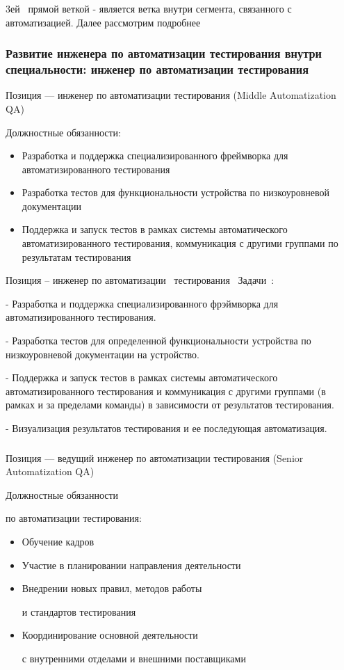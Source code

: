 \documentclass{../industrial-development}
\begin{document}
\lecturenotes

 3ей~\cite{mc} прямой веткой  - является ветка внутри сегмента, связанного с автоматизацией. Далее рассмотрим подробнее

\begin{frame} \frametitle{Развитие инженера по автоматизации тестирования внутри специальности: инженер по автоматизации тестирования }
 \begin{block}{}
  \alert{Позиция ---  инженер по автоматизации тестирования (Middle Automatization QA)}

Должностные обязанности: 
  \end{block}
  \begin{itemize}
  \item Разработка и поддержка специализированного фреймворка для автоматизированного тестирования
  \item  Разработка тестов для функциональности устройства по низкоуровневой документации 
  \item Поддержка и запуск тестов в рамках системы автоматического автоматизированного тестирования, коммуникация с другими группами по результатам тестирования
  \end{itemize}
\end{frame}

\lecturenotes

Позиция – инженер по автоматизации~\cite{hh} тестирования~\cite{itcf}
Задачи~\cite{rab}:

- Разработка и поддержка специализированного фрэймворка для автоматизированного тестирования.

- Разработка тестов для определенной функциональности устройства по низкоуровневой документации на устройство.

- Поддержка и запуск тестов в рамках системы автоматического автоматизированного тестирования и коммуникация с другими группами (в рамках и за пределами команды) в зависимости от результатов тестирования.

- Визуализация результатов тестирования и ее последующая автоматизация.

\begin{frame} \frametitle{}
 \begin{block}{}
  \alert{Позиция --- ведущий инженер по автоматизации тестирования (Senior Automatization QA)}

Должностные обязанности 

по автоматизации тестирования: 
  \end{block}
  \begin{itemize}
  \item Обучение кадров
  \item  Участие в планировании направления деятельности
  \item Внедрении новых правил, методов работы 

и стандартов тестирования
 \item Координирование основной деятельности 

с внутренними отделами и внешними поставщиками
  \end{itemize}
\end{frame}
\end{document}
